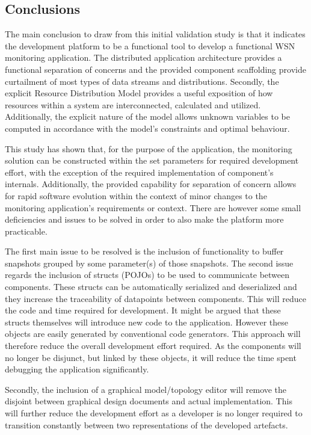 \subsection{Conclusions}
The main conclusion to draw from this initial validation study is that it indicates the development platform to be a functional tool to develop a functional WSN monitoring application. The distributed application architecture provides a functional separation of concerns and the provided component scaffolding provide curtailment of most types of data streams and distributions. Secondly, the explicit Resource Distribution Model provides a useful exposition of how resources within a system are interconnected, calculated and utilized. Additionally, the explicit nature of the model allows unknown variables to be computed in accordance with the model's constraints and optimal behaviour.

This study has shown that, for the purpose of the \idsystems \sensit application, the monitoring solution can be constructed within the set parameters for required development effort, with the exception of the required implementation of component's internals. Additionally, the provided capability for separation of concern allows for rapid software evolution within the context of minor changes to the monitoring application's requirements or context. There are however some small deficiencies and issues to be solved in order to also make the platform more practicable. 

The first main issue to be resolved is the inclusion of functionality to buffer snapshots grouped by some parameter(s) of those snapshots. The second issue regards the inclusion of structs (POJOs) to be used to communicate between components. These structs can be automatically serialized and deserialized and they increase the traceability of datapoints between components. This will reduce the code and time required for development. It might be argued that these structs themselves will introduce new code to the application. However these objects are easily generated by conventional code generators. This approach will therefore reduce the overall development effort required. As the components will no longer be disjunct, but linked by these objects, it will reduce the time spent debugging the application significantly.

Secondly, the inclusion of a graphical model/topology editor will remove the disjoint between graphical design documents and actual implementation. This will further reduce the development effort as a developer is no longer required to transition constantly between two representations of the developed artefacts.

